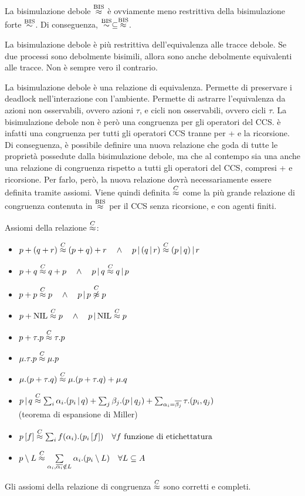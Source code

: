La bisimulazione debole $\overset{\textnormal{BIS}}{\approx}$ è ovviamente meno restrittiva della bisimulazione
forte $\overset{\textnormal{BIS}}{\sim}$. Di conseguenza, $\overset{\textnormal{BIS}}{\sim} \subseteq \overset{\textnormal{BIS}}{\approx}$.

\begin{rem}
    La bisimulazione debole è più restrittiva dell'equivalenza alle tracce debole.
    Se due processi sono debolmente bisimili, allora sono anche debolmente
    equivalenti alle tracce. Non è sempre vero il contrario.
\end{rem}
La bisimulazione debole è una relazione di equivalenza.
Permette di preservare i deadlock nell'interazione con l'ambiente.
Permette di astrarre l'equivalenza da azioni non osservabili, ovvero azioni
$\tau$, e cicli non osservabili, ovvero cicli $\tau$.
La bisimulazione debole non è però una congruenza per gli operatori del CCS.
è infatti una congruenza per tutti gli operatori CCS tranne per + e la ricorsione.\\

Di conseguenza, è possibile definire una nuova relazione che goda
di tutte le proprietà possedute dalla bisimulazione debole, ma che al contempo
sia una anche una relazione di congruenza rispetto a tutti gli operatori
del CCS, compresi + e ricorsione.
Per farlo, però, la nuova relazione dovrà necessariamente essere definita tramite
assiomi.
Viene quindi definita $\overset{C}{\approx}$ come la più grande
relazione di congruenza contenuta in $\overset{\textnormal{BIS}}{\approx}$ per il CCS senza ricorsione,
e con agenti finiti.

Assiomi della relazione $\overset{C}{\approx}$:
\begin{itemize}
    \item $p+(q+r) \overset{C}{\approx} (p+q)+r \quad \land \quad
    p\,|\,(q\,|\,r) \overset{C}{\approx} (p\,|\,q)\,|\,r$
    \item $p+q \overset{C}{\approx} q+p \quad \land \quad p\,|\,q \overset{C}{\approx} q\,|\,p$
    \item $p+p \overset{C}{\approx} p \quad \land \quad p\,|\,p \overset{C}{\not\approx} p$
    \item $p+\text{NIL} \overset{C}{\approx} p \quad \land \quad p\,|\,\text{NIL} \overset{C}{\approx} p$
    \item $p+\tau .p \overset{C}{\approx} \tau .p$
    \item $\mu . \tau .p \overset{C}{\approx} \mu .p$
    \item $\mu .(p+ \tau .q) \overset{C}{\approx} \mu .(p+ \tau .q) + \mu .q$
    \item $p\,|\,q \overset{C}{\approx} \sum_i \alpha_i .(p_i \,|\,q) +
    \sum_j \beta_j .(p \,|\,q_j) + \sum_{\alpha_i = \overline{\beta_j}}
    \tau .(p_i, q_j)$ \\ (teorema di espansione di Miller)
    \item $p\left[f\right] \overset{C}{\approx} \sum_i f(\alpha_i).(p_i\left[f\right]) \quad
    \forall f \textnormal{ funzione di etichettatura}$
    \item $p \setminus L \overset{C}{\approx} \sum\limits_{\alpha_i, \overline{\alpha_i} \notin L}
    \alpha_i.(p_i \setminus L) \quad \forall L \subseteq A$
\end{itemize}
Gli assiomi della relazione di congruenza $\overset{C}{\approx}$ sono corretti e completi.

